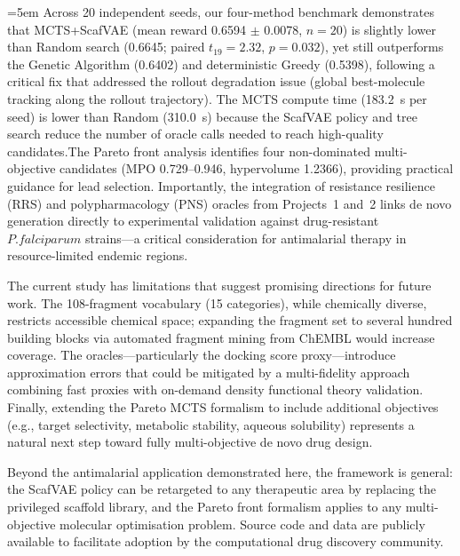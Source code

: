 \documentclass[jcim,article,layout=manuscript]{achemso}
\begin{document}
\bgroup\emergencystretch=5em
Across 20 independent seeds, our four-method benchmark demonstrates that
MCTS+\allowbreak ScafVAE (mean reward 0.6594 $\pm$ 0.0078, $n=20$) is slightly lower than Random search (0.6645; paired $t_{19} = 2.32$, $p = 0.032$), yet still outperforms the Genetic Algorithm (0.6402) and deterministic Greedy (0.5398),
following a critical fix that addressed the rollout degradation issue
(global best-molecule tracking along the rollout trajectory). The
MCTS compute time (183.2~s per seed) is lower than Random (310.0~s)
because the ScafVAE policy and tree search reduce the number of oracle
calls needed to reach high-quality candidates.The Pareto front analysis identifies four non-dominated multi-objective candidates
(MPO 0.729--0.946, hypervolume 1.2366), providing practical guidance for
lead selection. Importantly, the
integration of resistance resilience (RRS) and polypharmacology (PNS)
oracles from Projects~1 and~2 links de novo generation directly to
experimental validation against drug-resistant $P. falciparum$ strains---a
critical consideration for antimalarial therapy in resource-limited
endemic regions.
\egroup

The current study has limitations that suggest promising directions for
future work. The 108-fragment vocabulary (15 categories), while chemically diverse, restricts
accessible chemical space; expanding the fragment set to several hundred
building blocks via automated fragment mining from ChEMBL would increase
coverage. The oracles---particularly the docking score proxy---introduce
approximation errors that could be mitigated by a multi-fidelity approach
combining fast proxies with on-demand density functional theory validation.
Finally, extending the Pareto MCTS formalism to include additional
objectives (e.g., target selectivity, metabolic stability, aqueous
solubility) represents a natural next step toward fully multi-objective
de novo drug design.

Beyond the antimalarial application demonstrated here, the framework is
general: the ScafVAE policy can be retargeted to any therapeutic area by
replacing the privileged scaffold library, and the Pareto front formalism
applies to any multi-objective molecular optimisation problem. Source code
and data are publicly available to facilitate adoption by the
computational drug discovery community.

\end{document}
